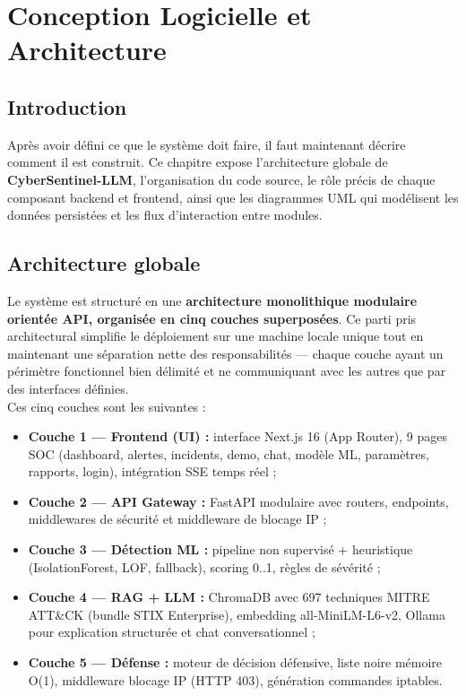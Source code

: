 \documentclass[12pt,a4paper]{report}
\begin{document}
\newpage

\chapter{Conception Logicielle et Architecture}

\section*{Introduction}
\begin{onehalfspace}
Après avoir défini ce que le système doit faire, il faut maintenant décrire
comment il est construit. Ce chapitre expose l'architecture globale de
\textbf{CyberSentinel-LLM}, l'organisation du code source, le rôle précis
de chaque composant backend et frontend, ainsi que les diagrammes UML qui
modélisent les données persistées et les flux d'interaction entre modules.
\end{onehalfspace}

\section{Architecture globale}
\begin{onehalfspace}
Le système est structuré en une \textbf{architecture monolithique modulaire
orientée API, organisée en cinq couches superposées}. Ce parti pris
architectural simplifie le déploiement sur une machine locale unique tout
en maintenant une séparation nette des responsabilités — chaque couche ayant
un périmètre fonctionnel bien délimité et ne communiquant avec les autres
que par des interfaces définies.\\

Ces cinq couches sont les suivantes :
\begin{itemize}
  \item[\ding{43}] \textbf{Couche 1 — Frontend (UI) :} interface Next.js 16
  (App Router), 9 pages SOC (dashboard, alertes, incidents, demo, chat,
  modèle ML, paramètres, rapports, login), intégration SSE temps réel ;
  \item[\ding{43}] \textbf{Couche 2 — API Gateway :} FastAPI modulaire avec
  routers, endpoints, middlewares de sécurité et middleware de blocage IP ;
  \item[\ding{43}] \textbf{Couche 3 — Détection ML :} pipeline non supervisé
  + heuristique (IsolationForest, LOF, fallback), scoring 0..1, règles de
  sévérité ;
  \item[\ding{43}] \textbf{Couche 4 — RAG + LLM :} ChromaDB avec 697
  techniques MITRE ATT\&CK (bundle STIX Enterprise), embedding all-MiniLM-L6-v2, Ollama pour
  explication structurée et chat conversationnel ;
  \item[\ding{43}] \textbf{Couche 5 — Défense :} moteur de décision
  défensive, liste noire mémoire O(1), middleware blocage IP (HTTP 403),
  génération commandes iptables.
\end{itemize}
\end{onehalfspace}
\end{document}
